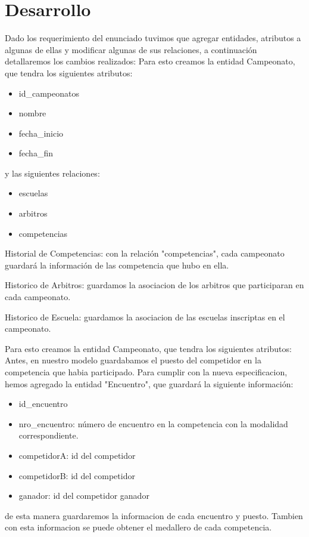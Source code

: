 \section{Desarrollo}

Dado los requerimiento del enunciado tuvimos que agregar entidades, atributos a algunas de ellas y modificar algunas de sus relaciones, a continuación detallaremos los cambios realizados:
Para esto creamos la entidad Campeonato, que tendra los siguientes atributos:
\begin{itemize}
	\item id_campeonatos
	\item nombre
	\item fecha_inicio
	\item fecha_fin
\end{itemize}
y las siguientes relaciones:
\begin{itemize}
	\item escuelas
	\item arbitros
	\item competencias
\end{itemize}
Historial de Competencias: con la relación "competencias", cada campeonato guardará la información de las competencia que hubo en ella.

Historico de Arbitros: guardamos la asociacion de los arbitros que participaran en cada campeonato.

Historico de Escuela: guardamos la asociacion de las escuelas inscriptas en el campeonato.

Para esto creamos la entidad Campeonato, que tendra los siguientes atributos:
Antes, en nuestro modelo guardabamos el puesto del competidor en la competencia que habia participado. Para cumplir con la nueva especificacion, hemos agregado la entidad "Encuentro", que guardará la siguiente información:
\begin{itemize}
	\item id_encuentro
	\item nro_encuentro: número de encuentro en la competencia con la modalidad correspondiente.
	\item competidorA: id del competidor
	\item competidorB: id del competidor
	\item ganador: id del competidor ganador 
\end{itemize}
de esta manera guardaremos la informacion de cada encuentro y puesto.
Tambien con esta informacion se puede obtener el medallero de cada competencia.


